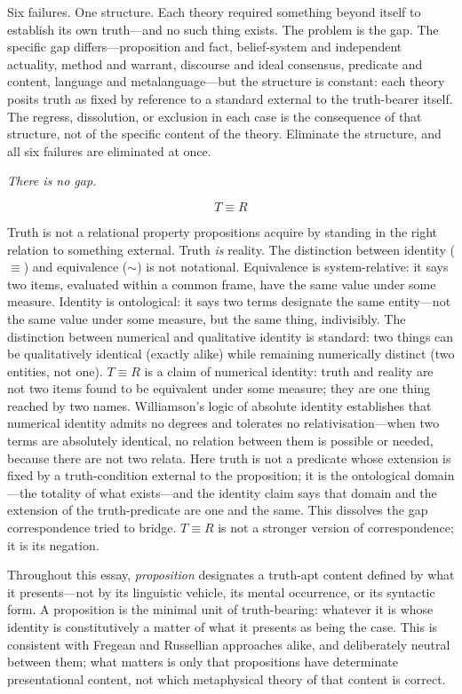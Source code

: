\documentclass[11pt, oneside]{article}
\newcommand{\isolate}[1]{%
    \vspace{8pt}%
    \begin{center}\itshape #1\end{center}%
    \vspace{8pt}%
}
\begin{document}
Six failures. One structure. Each theory required something beyond
itself to establish its own truth---and no such thing exists. The problem
is the gap. The specific gap differs---proposition and fact,
belief-system and independent actuality, method and warrant, discourse
and ideal consensus, predicate and content, language and
metalanguage---but the structure is constant: each theory posits truth
as fixed by reference to a standard external to the truth-bearer itself.
The regress, dissolution, or exclusion in each case is the consequence
of that structure, not of the specific content of the theory. Eliminate
the structure, and all six failures are eliminated at once.

\isolate{There is no gap.}

\[
\boxed{T \equiv R}
\]

Truth is not a relational property propositions acquire by standing in
the right relation to something external. Truth \textit{is} reality. The
distinction between identity ($\equiv$) and equivalence ($\sim$) is not
notational. Equivalence is system-relative: it says two items, evaluated
within a common frame, have the same value under some measure. Identity
is ontological: it says two terms designate the same entity---not the
same value under some measure, but the same thing, indivisibly. The
distinction between numerical and qualitative identity is standard: two
things can be qualitatively identical (exactly alike) while remaining
numerically distinct (two entities, not one). $T \equiv R$ is a claim of
numerical identity: truth and reality are not two items found to be
equivalent under some measure; they are one thing reached by two names.
Williamson's logic of absolute identity establishes that numerical
identity admits no degrees and tolerates no relativisation---when two
terms are absolutely identical, no relation between them is possible or
needed, because there are not two relata. Here truth is not a predicate
whose extension is fixed by a truth-condition external to the
proposition; it is the ontological domain---the totality of what
exists---and the identity claim says that domain and the extension of
the truth-predicate are one and the same. This dissolves the gap
correspondence tried to bridge. $T \equiv R$ is not a stronger version
of correspondence; it is its negation.

Throughout this essay, \textit{proposition} designates a truth-apt
content defined by what it presents---not by its linguistic vehicle,
its mental occurrence, or its syntactic form. A proposition is the
minimal unit of truth-bearing: whatever it is whose identity is
constitutively a matter of what it presents as being the case. This is
consistent with Fregean and Russellian approaches alike, and deliberately
neutral between them; what matters is only that propositions have
determinate presentational content, not which metaphysical theory
of that content is correct.
\end{document}
